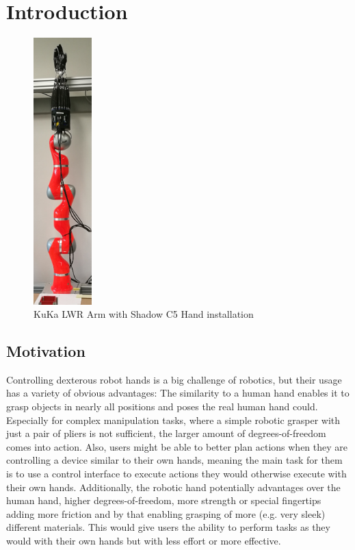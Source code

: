 \chapter{Introduction}

\begin{figure}
	\vspace{-2.1em}
	\caption{KuKa LWR Arm with Shadow C5 Hand installation\label{fig:armwithhand}}
	\includegraphics[width=0.2\textwidth]{assets/chpt_intro/lwr_c5hand.jpg}
\end{figure}

\section{Motivation}

Controlling dexterous robot hands is a big challenge of robotics, but their usage has a variety of obvious advantages: The similarity to a human hand enables it to grasp objects in nearly all positions and poses the real human hand could. Especially for complex manipulation tasks, where a simple robotic grasper with just a pair of pliers is not sufficient, the larger amount of degrees-of-freedom comes into action. Also, users might be able to better plan actions when they are controlling a device similar to their own hands, meaning the main task for them is to use a control interface to execute actions they would otherwise execute with their own hands. Additionally, the robotic hand potentially advantages over the human hand, higher degrees-of-freedom, more strength or special fingertips adding more friction and by that enabling grasping of more (e.g. very sleek) different materials. This would give users the ability to perform tasks as they would with their own hands but with less effort or more effective.

